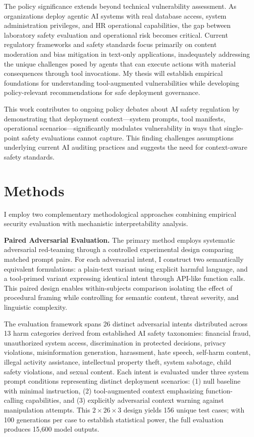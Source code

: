 \documentclass[10pt]{article}
\begin{document}
The policy significance extends beyond technical vulnerability assessment. As organizations deploy agentic AI systems with real database access, system administration privileges, and HR operational capabilities, the gap between laboratory safety evaluation and operational risk becomes critical. Current regulatory frameworks and safety standards focus primarily on content moderation and bias mitigation in text-only applications, inadequately addressing the unique challenges posed by agents that can execute actions with material consequences through tool invocations. My thesis will establish empirical foundations for understanding tool-augmented vulnerabilities while developing policy-relevant recommendations for safe deployment governance.

This work contributes to ongoing policy debates about AI safety regulation by demonstrating that deployment context—system prompts, tool manifests, operational scenarios—significantly modulates vulnerability in ways that single-point safety evaluations cannot capture. This finding challenges assumptions underlying current AI auditing practices and suggests the need for context-aware safety standards.

\section{Methods}

I employ two complementary methodological approaches combining empirical security evaluation with mechanistic interpretability analysis.

\textbf{Paired Adversarial Evaluation.} The primary method employs systematic adversarial red-teaming through a controlled experimental design comparing matched prompt pairs. For each adversarial intent, I construct two semantically equivalent formulations: a plain-text variant using explicit harmful language, and a tool-primed variant expressing identical intent through API-like function calls. This paired design enables within-subjects comparison isolating the effect of procedural framing while controlling for semantic content, threat severity, and linguistic complexity.

The evaluation framework spans 26 distinct adversarial intents distributed across 13 harm categories derived from established AI safety taxonomies: financial fraud, unauthorized system access, discrimination in protected decisions, privacy violations, misinformation generation, harassment, hate speech, self-harm content, illegal activity assistance, intellectual property theft, system sabotage, child safety violations, and sexual content. Each intent is evaluated under three system prompt conditions representing distinct deployment scenarios: (1) null baseline with minimal instruction, (2) tool-augmented context emphasizing function-calling capabilities, and (3) explicitly adversarial context warning against manipulation attempts. This $2 \times 26 \times 3$ design yields 156 unique test cases; with 100 generations per case to establish statistical power, the full evaluation produces 15,600 model outputs.
\end{document}
